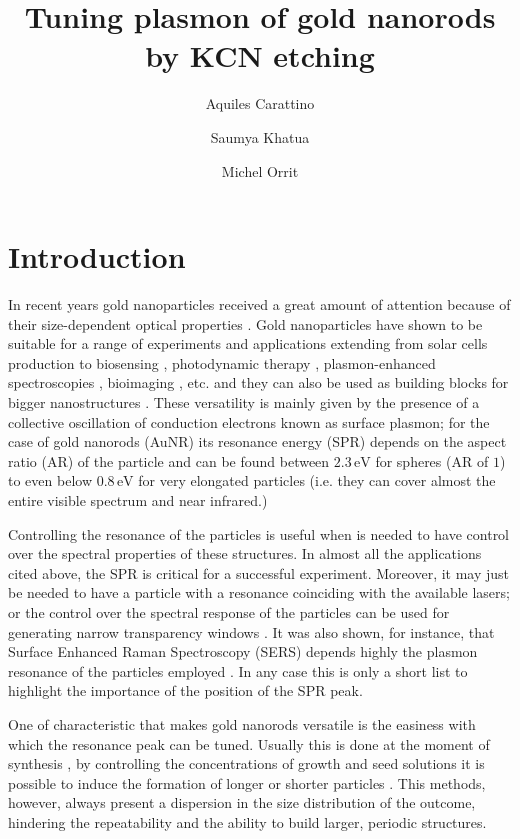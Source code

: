 \documentclass[twocolumn]{article}
\title{Tuning plasmon of gold nanorods by KCN etching}
\author{Aquiles Carattino \and Saumya Khatua \and Michel
Orrit}
\begin{document}
\maketitle
{}

\section{Introduction}
In recent years gold nanoparticles received a great amount of attention because
of their size-dependent optical properties \cite{Zijlstra2011}. Gold
nanoparticles have shown to be suitable for a range of experiments and
applications extending from solar cells production \cite{Catchpole2008} to
biosensing \cite{Zijlstra2012}, photodynamic therapy \cite{Zhao2014},
plasmon-enhanced spectroscopies \cite{Sivapalan2013}, bioimaging
\cite{VandenBroek2013}, etc. and they can also be used as building blocks for
bigger nanostructures \cite{Ivanov2011} \cite{Do2013} \cite{Guffey2011}. These
versatility is mainly given by the presence of a collective oscillation of
conduction electrons known as surface plasmon; for the case of gold nanorods
(AuNR) its resonance energy (SPR) depends on the aspect ratio (AR) of the
particle and can be found between $2.3\,\textrm{eV}$ for spheres (AR of $1$) to
even below $0.8\,\textrm{eV}$ for very elongated particles (i.e. they can cover
almost the entire visible spectrum and near infrared.)

Controlling the resonance of the particles is useful when is needed to have
control over the spectral properties of these structures. In almost all the
applications cited above, the SPR is critical for a successful experiment.
Moreover, it may just be needed to have a particle with a resonance coinciding
with the available lasers; or the control over the spectral response of the
particles can be used for generating narrow transparency windows
\cite{Biswas2013}. It was also shown, for instance, that Surface Enhanced Raman
Spectroscopy (SERS) depends highly the plasmon resonance of the particles
employed \cite{Sivapalan2013}. In any case this is only a short list to
highlight the importance of the position of the SPR peak.

One of characteristic that makes gold nanorods versatile is the easiness with
which the resonance peak can be tuned. Usually this is done at the moment of
synthesis \cite{Gou2005}, by controlling the concentrations of growth and seed
solutions it is possible to induce the formation of longer or shorter particles
\cite{Nikoobakht2003}. This methods, however, always present a dispersion in the
size distribution of the outcome, hindering the repeatability and the ability to
build larger, periodic structures.
\end{document}
